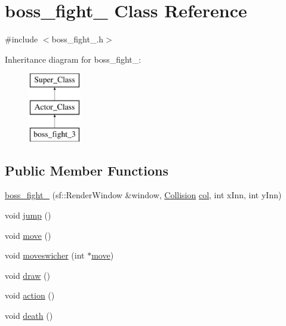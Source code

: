 \hypertarget{classboss__fight__3}{}\section{boss\+\_\+fight\+\_ Class Reference}
\label{classboss__fight__3}


{\ttfamily \#include $<$boss\+\_\+fight\+\_.\+h$>$}

Inheritance diagram for boss\+\_\+fight\+\_\+:\begin{figure}[H]
\begin{center}
\leavevmode
\includegraphics[height=3.000000cm]{classboss__fight__3}
\end{center}
\end{figure}
\subsection*{Public Member Functions}
\begin{DoxyCompactItemize}
\item 
\hyperlink{classboss__fight__3_acce476f4d093dcf8266d554d5b574edf}{boss\+\_\+fight\+\_} (sf\+::\+Render\+Window \&window, \hyperlink{class_collision}{Collision} \hyperlink{classboss__fight__3_a295b9c6b1bc68af57675c8eba5000536}{col}, int x\+Inn, int y\+Inn)
\item 
void \hyperlink{classboss__fight__3_ab642323b24a5f139339fffba4749ebdc}{jump} ()
\item 
void \hyperlink{classboss__fight__3_ab70b9f8a73d4fd1fe807f09c76a2267a}{move} ()
\item 
void \hyperlink{classboss__fight__3_adeca20141361055bcbc3439eb73e34db}{moveswicher} (int $\ast$\hyperlink{classboss__fight__3_ab70b9f8a73d4fd1fe807f09c76a2267a}{move})
\item 
void \hyperlink{classboss__fight__3_adcab7141b564704e89778a3303d529a7}{draw} ()
\item 
void \hyperlink{classboss__fight__3_adfe8a4ff5e97513348411aa89a91e68c}{action} ()
\item 
void \hyperlink{classboss__fight__3_a48e73e4ae1484663a108df1f420b8d9e}{death} ()
\end{DoxyCompactItemize}
